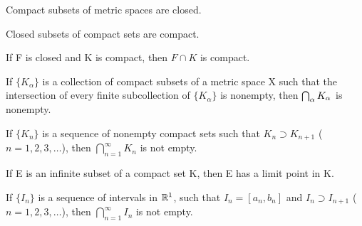 \begin{theorem} %
  \label{thm:chap2:compact_implies_closed}
  Compact subsets of metric spaces are closed.
\end{theorem}

\begin{theorem} %
  \label{thm:chap2:closed_subset_compact}
  Closed subsets of compact sets are compact.
\end{theorem}

\begin{corollary} %
  \label{cor:chap2:closed_intersect_compact}
  If F is closed and K is compact, then $F \cap K$ is compact.
\end{corollary}

\begin{theorem} %
  \label{thm:chap2:compact_intersection_property}
  If $\{K_\alpha\}$ is a collection of compact subsets of a metric
  space X such that the intersection of every finite subcollection of
  $\{K_\alpha\}$ is nonempty, then $\bigcap_{\alpha} K_\alpha$ is nonempty.
\end{theorem}

\begin{corollary} %
  \label{cor:chap2:nested_compact_nonempty}
  If $\{K_n\}$ is a sequence of nonempty compact sets such that $K_n
  \supset K_{n+1}$ ($n=1, 2, 3, \dots$), then $\bigcap_{n=1}^\infty
  K_n$ is not empty.
\end{corollary}

\begin{theorem} %
  \label{thm:chap2:compact_limit_point_property}
  If E is an infinite subset of a compact set K, then E has a limit point in K.
\end{theorem}

\begin{theorem} %
  \label{thm:chap2:nested_intervals_R1}
  If $\{I_n\}$ is a sequence of intervals in $\mathbb{R}^1$, such that $I_n =
  [a_n, b_n]$ and $I_n \supset I_{n+1}$ ($n=1, 2, 3, \dots$), then
  $\bigcap_{n=1}^\infty I_n$ is not empty.
\end{theorem}

